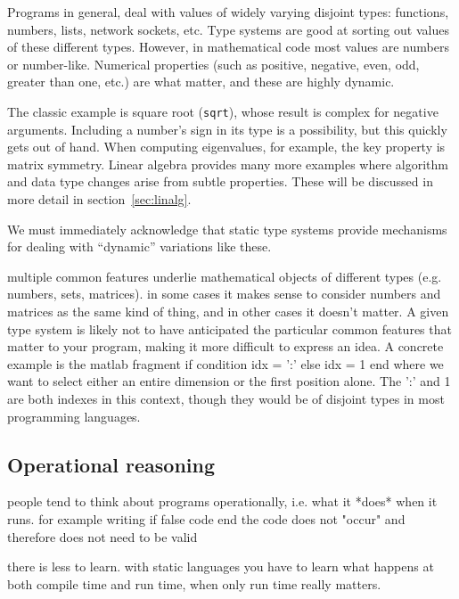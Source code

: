 {Programs in general, deal with values of widely varying disjoint types:
functions, numbers, lists, network sockets, etc.
Type systems are good at sorting out values of these different types.
However, in mathematical code most values are numbers or number-like.
Numerical properties (such as positive, negative, even, odd, greater
than one, etc.) are what matter, and these are highly dynamic.

The classic example is square root (\texttt{sqrt}), whose result is complex
for negative arguments.
Including a number's sign in its type is a possibility, but this quickly gets
out of hand.
When computing eigenvalues, for example, the key property is matrix
symmetry.
Linear algebra provides many more examples where algorithm and data type
changes arise from subtle properties. These will be discussed in more
detail in section~\ref{sec:linalg}.

We must immediately acknowledge that static type systems provide
mechanisms for dealing with ``dynamic'' variations like these.




multiple common features underlie mathematical objects of different
types (e.g. numbers, sets, matrices). in some cases it makes sense to
consider numbers and matrices as the same kind of thing, and in other
cases it doesn't matter. A given type system is likely not to have
anticipated the particular common features that matter to your program,
making it more difficult to express an idea. A concrete example is
the matlab fragment
if condition
  idx = ':'
else
  idx = 1
end
where we want to select either an entire dimension or the first position
alone. The ':' and 1 are both indexes in this context, though they would
be of disjoint types in most programming languages.


\subsection{Operational reasoning}

people tend to think about programs operationally, i.e. what it *does* when
it runs. for example writing
if false
  code
end
the code does not "occur" and therefore does not need to be valid


there is less to learn. with static languages you have to learn what happens
at both compile time and run time, when only run time really matters.


}
